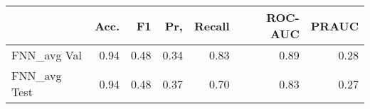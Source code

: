 \begin{tabular}{lrrrrrr}
\toprule
{} &  Acc. &    F1 &   Pr, &  Recall &  ROC-AUC &  PRAUC \\
\midrule
FNN\_avg Val  &  0.94 &  0.48 &  0.34 &    0.83 &     0.89 &   0.28 \\
FNN\_avg Test &  0.94 &  0.48 &  0.37 &    0.70 &     0.83 &   0.27 \\
\bottomrule
\end{tabular}
